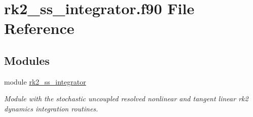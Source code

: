 \hypertarget{rk2__ss__integrator_8f90}{}\section{rk2\+\_\+ss\+\_\+integrator.\+f90 File Reference}
\label{rk2__ss__integrator_8f90}
\subsection*{Modules}
\begin{DoxyCompactItemize}
\item 
module \hyperlink{namespacerk2__ss__integrator}{rk2\+\_\+ss\+\_\+integrator}
\begin{DoxyCompactList}\small\item\em Module with the stochastic uncoupled resolved nonlinear and tangent linear rk2 dynamics integration routines. \end{DoxyCompactList}\end{DoxyCompactItemize}
